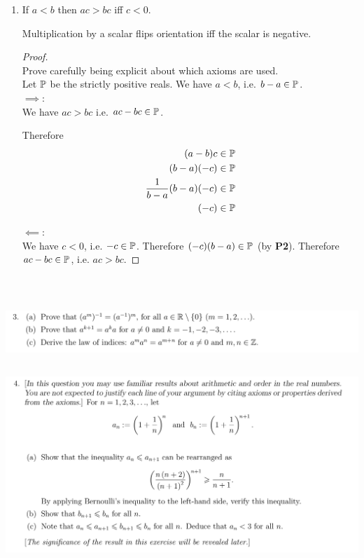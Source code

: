 \documentclass[12pt]{article}
\begin{document}
\begin{enumerate}[label=(\alph*)]
\item
  \begin{claim*}
    If $a < b$ then $ac > bc$ iff $c < 0$.
  \end{claim*}
  \begin{intuition*}
    Multiplication by a scalar flips orientation iff the scalar is negative.
  \end{intuition*}
  \begin{proof}~\\
     Prove carefully being explicit about which axioms are used.\\
    Let $\P$ be the strictly positive reals. We have $a < b$, i.e. $b - a \in \P$.\\
    $\implies$:\\
    We have $ac > bc$ i.e. $ac - bc \in \P$.

    Therefore
    \begin{align*}
      (a - b)c &\in \P\\
      (b - a)(-c) &\in \P\\
      \frac{1}{b-a}(b - a)(-c) &\in \P\\
      (-c) &\in \P
    \end{align*}

    $\impliedby$:\\
    We have $c < 0$, i.e. $-c \in \P$. Therefore $(-c)(b - a) \in \P$ (by {\bf P2}). Therefore
    $ac - bc \in \P$, i.e. $ac > bc$.
  \end{proof}
\end{enumerate}~\\

\newpage
\subsection{}
\begin{mdframed}
\includegraphics[width=400pt]{img/oxford-prelims-M2-analysis-I-sheet-1-3.png}
\end{mdframed}
\newpage
\subsection{}
\begin{mdframed}
\includegraphics[width=400pt]{img/oxford-prelims-M2-analysis-I-sheet-1-4.png}
\end{mdframed}
\end{document}
